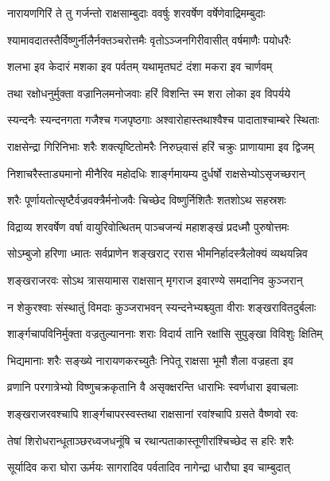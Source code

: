 
\twolineshloka
{नारायणगिरिं ते तु गर्जन्तो राक्षसाम्बुदाः}
{ववर्षुः शरवर्षेण वर्षेणेवाद्रिमम्बुदाः} %

\twolineshloka
{श्यामावदातस्तैर्विष्णुर्नीलैर्नक्तञ्चरोत्तमैः}
{वृतोऽञ्जनगिरीवासीत् वर्षमाणैः पयोधरैः} %

\twolineshloka
{शलभा इव केदारं मशका इव पर्वतम्}
{यथामृतघटं दंशा मकरा इव चार्णवम्} %

\twolineshloka
{तथा रक्षोधनुर्मुक्ता वज्रानिलमनोजवाः}
{हरिं विशन्ति स्म शरा लोका इव विपर्यये} %

\twolineshloka
{स्यन्दनैः स्यन्दनगता गजैश्च गजपृष्ठगाः}
{अश्वारोहास्तथाश्वैश्च पादाताश्चाम्बरे स्थिताः} %

\twolineshloka
{राक्षसेन्द्रा गिरिनिभाः शरैः शक्त्यृष्टितोमरैः}
{निरुछ्वासं हरिं चक्रुः प्राणायामा इव द्विजम्} %

\twolineshloka
{निशाचरैस्ताड्यमानो मीनैरिव महोदधिः}
{शार्ङ्गमायम्य दुर्धर्षो राक्षसेभ्योऽसृजच्छरान्} %

\twolineshloka
{शरैः पूर्णायतोत्सृष्टैर्वज्रवक्त्रैर्मनोजवैः}
{चिच्छेद विष्णुर्निशितैः शतशोऽथ सहस्रशः} %

\twolineshloka
{विद्राव्य शरवर्षेण वर्षा वायुरिवोत्थितम्}
{पाञ्चजन्यं महाशङ्खं प्रदध्मौ पुरुषोत्तमः} %

\twolineshloka
{सोऽम्बुजो हरिणा ध्मातः सर्वप्राणेन शङ्खराट्}
{ररास भीमनिर्हादस्त्रैलोक्यं व्यथयन्निव} %

\twolineshloka
{शङ्खराजरवः सोऽथ त्रासयामास राक्षसान्}
{मृगराज इवारण्ये समदानिव कुञ्जरान्} %

\twolineshloka
{न शेकुरश्वाः संस्थातुं विमदाः कुञ्जराभवन्}
{स्यन्दनेभ्यश्च्युता वीराः शङ्खरावितदुर्बलाः} %

\twolineshloka
{शार्ङ्गचापविनिर्मुक्ता वज्रतुल्याननाः शराः}
{विदार्य तानि रक्षांसि सुपुङ्खा विविशुः क्षितिम्} %

\twolineshloka
{भिद्यमानाः शरैः सङ्ख्ये नारायणकरच्युतैः}
{निपेतू राक्षसा भूमौ शैला वज्रहता इव} %

\twolineshloka
{व्रणानि परगात्रेभ्यो विष्णुचक्रकृतानि वै}
{असृक्क्षरन्ति धाराभिः स्वर्णधारा इवाचलाः} %

\twolineshloka
{शङ्खराजरवश्चापि शार्ङ्गचापरस्वस्तथा}
{राक्षसानां रवांश्चापि ग्रसते वैष्णवो रवः} %

\twolineshloka
{तेषां शिरोधरान्धूताञ्छरध्वजधनूंषि च}
{रथान्पताकास्तूणीरांश्चिच्छेद स हरिः शरैः} %

\twolineshloka
{सूर्यादिव करा घोरा ऊर्मयः सागरादिव}
{पर्वतादिव नागेन्द्रा धारौघा इव चाम्बुदात्} %

